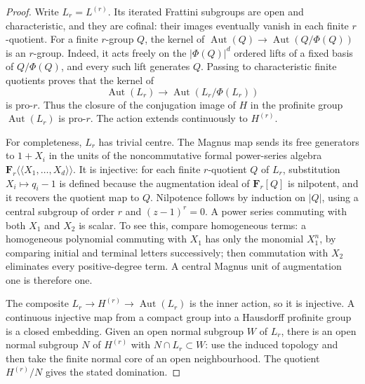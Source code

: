 \documentclass[11pt,a4paper]{article}
\newcommand{\F}{\mathbf F}
\newcommand{\Aut}{\operatorname{Aut}}
\begin{document}
\begin{proof}
Write $L_r=L^{(r)}$. Its iterated Frattini subgroups are open and
characteristic, and they are cofinal: their images eventually vanish in
each finite $r$-quotient. For a finite $r$-group $Q$, the kernel of
$\Aut(Q)\to\Aut(Q/\Phi(Q))$ is an $r$-group. Indeed, it acts freely
on the $|\Phi(Q)|^d$ ordered lifts of a fixed basis of $Q/\Phi(Q)$,
and every such lift generates $Q$. Passing to characteristic finite
quotients proves that the kernel of
\[
 \Aut(L_r)\longrightarrow\Aut(L_r/\Phi(L_r))
\]
is pro-$r$. Thus the closure of the conjugation image of $H$ in the
profinite group $\Aut(L_r)$ is pro-$r$. The action extends continuously
to $H^{(r)}$.

For completeness, $L_r$ has trivial centre. The Magnus map sends its
free generators to $1+X_i$ in the units of the noncommutative formal
power-series algebra $\F_r\langle\!\langle X_1,\ldots,X_d\rangle\!\rangle$.
It is injective: for each finite $r$-quotient $Q$ of $L_r$, substitution
$X_i\mapsto q_i-1$ is defined because the augmentation ideal of
$\F_r[Q]$ is nilpotent, and it recovers the quotient map to $Q$.
Nilpotence follows by induction on $|Q|$, using a central subgroup of
order $r$ and $(z-1)^r=0$. A power series commuting with both $X_1$
and $X_2$ is scalar. To see this, compare homogeneous terms: a
homogeneous polynomial commuting with $X_1$ has only the monomial
$X_1^n$, by comparing initial and terminal letters successively; then
commutation with $X_2$ eliminates every positive-degree term. A central
Magnus unit of augmentation one is therefore one.

The composite $L_r\to H^{(r)}\to\Aut(L_r)$ is the inner action,
so it is injective. A continuous injective map from a compact group
into a Hausdorff profinite group is a closed embedding. Given an open
normal subgroup $W$ of $L_r$, there is an open normal subgroup $N$ of
$H^{(r)}$ with $N\cap L_r\subset W$: use the induced topology and
then take the finite normal core of an open neighbourhood. The quotient
$H^{(r)}/N$ gives the stated domination.
\end{proof}
\end{document}
